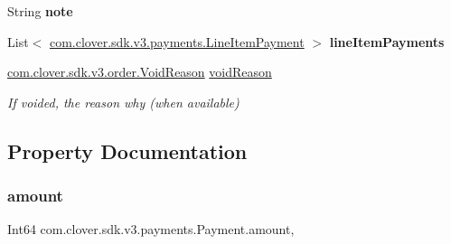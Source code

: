 \begin{DoxyCompactItemize}
\item 
\mbox{\label{classcom_1_1clover_1_1sdk_1_1v3_1_1payments_1_1_payment_a7c2ec32ed514f03ac272e7b29e5c36fb}} 
String {\bfseries note}
\item 
\mbox{\label{classcom_1_1clover_1_1sdk_1_1v3_1_1payments_1_1_payment_a576d3b704d1e6a5cb5f222beda590c24}} 
List$<$ \hyperlink{classcom_1_1clover_1_1sdk_1_1v3_1_1payments_1_1_line_item_payment}{com.\+clover.\+sdk.\+v3.\+payments.\+Line\+Item\+Payment} $>$ {\bfseries line\+Item\+Payments}
\item 
\hyperlink{namespacecom_1_1clover_1_1sdk_1_1v3_1_1order_acb5aac0c1f6aeeb5b636223a69d2dec2}{com.\+clover.\+sdk.\+v3.\+order.\+Void\+Reason} \hyperlink{classcom_1_1clover_1_1sdk_1_1v3_1_1payments_1_1_payment_a037af65f45c8fd866641b93efb74cfb5}{void\+Reason}
\begin{DoxyCompactList}\small\item\em If voided, the reason why (when available) \end{DoxyCompactList}\end{DoxyCompactItemize}


\subsection{Property Documentation}
\mbox{\label{classcom_1_1clover_1_1sdk_1_1v3_1_1payments_1_1_payment_a1fb932f232dd871adb368bd19dcd9ee3}} 
\subsubsection{\texorpdfstring{amount}{amount}}
{\footnotesize\ttfamily Int64 com.\+clover.\+sdk.\+v3.\+payments.\+Payment.\+amount\hspace{0.3cm}{\ttfamily [get]}, {\ttfamily [set]}}



